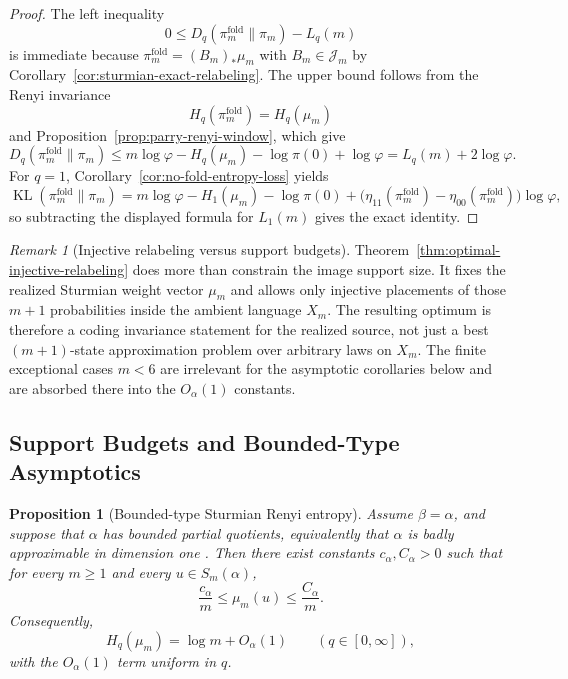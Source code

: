 \documentclass[11pt,letterpaper]{article}
\numberwithin{equation}{section}
\theoremstyle{plain}
\newtheorem{proposition}[theorem]{Proposition}
\theoremstyle{definition}
\theoremstyle{remark}
\newtheorem{remark}[theorem]{Remark}
\DeclareMathOperator{\KL}{KL}
\begin{document}
\begin{proof}
The left inequality
\[
0\le D_q(\pi_m^{\mathrm{fold}}\|\pi_m)-L_q(m)
\]
is immediate because \(\pi_m^{\mathrm{fold}}=(B_m)_*\mu_m\) with
\(B_m\in\mathcal J_m\) by Corollary~\ref{cor:sturmian-exact-relabeling}. The
upper bound follows from the Renyi invariance
\[
H_q(\pi_m^{\mathrm{fold}})=H_q(\mu_m)
\]
and Proposition~\ref{prop:parry-renyi-window}, which give
\[
D_q(\pi_m^{\mathrm{fold}}\|\pi_m)
\le
m\log\varphi-H_q(\mu_m)-\log\pi(0)+\log\varphi
=
L_q(m)+2\log\varphi.
\]
For \(q=1\), Corollary~\ref{cor:no-fold-entropy-loss} yields
\[
\KL(\pi_m^{\mathrm{fold}}\|\pi_m)
=
m\log\varphi-H_1(\mu_m)-\log\pi(0)
+\bigl(\eta_{11}(\pi_m^{\mathrm{fold}})
-\eta_{00}(\pi_m^{\mathrm{fold}})\bigr)\log\varphi,
\]
so subtracting the displayed formula for \(L_1(m)\) gives the exact identity.
\end{proof}

\begin{remark}[Injective relabeling versus support budgets]
\label{rem:injective-relabeling-stronger}
Theorem~\ref{thm:optimal-injective-relabeling} does more than constrain the
image support size. It fixes the realized Sturmian weight vector \(\mu_m\) and
allows only injective placements of those \(m+1\) probabilities inside the
ambient language \(X_m\). The resulting optimum is therefore a coding
invariance statement for the realized source, not just a best \((m+1)\)-state
approximation problem over arbitrary laws on \(X_m\). The finite exceptional
cases \(m<6\) are irrelevant for the asymptotic corollaries below and are
absorbed there into the \(O_\alpha(1)\) constants.
\end{remark}

\subsection{Support Budgets and Bounded-Type Asymptotics}

\begin{proposition}[Bounded-type Sturmian Renyi entropy]\label{prop:bounded-type-sturmian-entropy}
Assume \(\beta=\alpha\), and suppose that \(\alpha\) has bounded partial
quotients, equivalently that \(\alpha\) is badly approximable in dimension one
\cite{Cassels1957,Schmidt1969BadlyApproximableSystems}. Then there exist
constants \(c_\alpha,C_\alpha>0\) such that for
every \(m\ge 1\) and every \(u\in S_m(\alpha)\),
\[
\frac{c_\alpha}{m}\le \mu_m(u)\le \frac{C_\alpha}{m}.
\]
Consequently,
\[
H_q(\mu_m)=\log m+O_\alpha(1)
\qquad (q\in[0,\infty]),
\]
with the \(O_\alpha(1)\) term uniform in \(q\).
\end{proposition}
\end{document}
